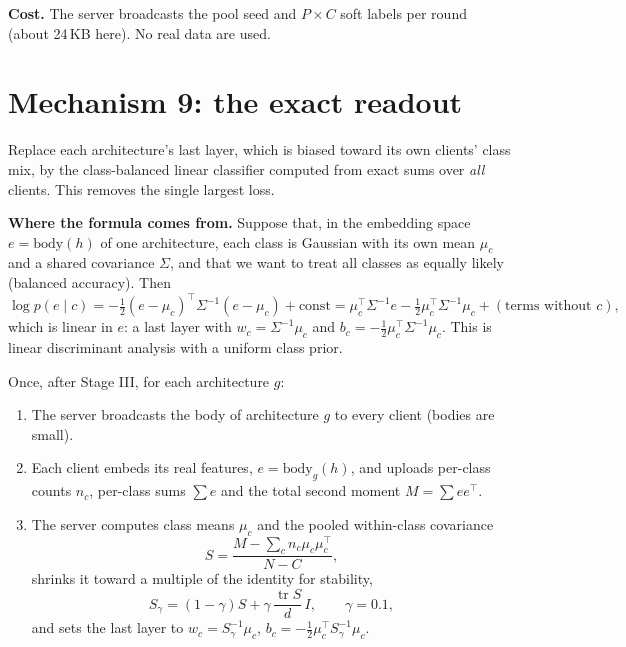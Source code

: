 \documentclass[11pt]{article}
\theoremstyle{plain}
\theoremstyle{definition}
\begin{document}
\textbf{Cost.} The server broadcasts the pool seed and $P\times C$ soft labels per round (about 24\,KB here). No real
data are used.

\section{Mechanism 9: the exact readout}\label{sec:er}

\begin{purpose}
Replace each architecture's last layer, which is biased toward its own clients' class mix, by the class-balanced linear
classifier computed from exact sums over \emph{all} clients. This removes the single largest loss.
\end{purpose}

\textbf{Where the formula comes from.} Suppose that, in the embedding space $e=\mathrm{body}(h)$ of one architecture,
each class is Gaussian with its own mean $\mu_c$ and a shared covariance $\Sigma$, and that we want to treat all classes
as equally likely (balanced accuracy). Then
\[
\log p(e\mid c)=-\tfrac12(e-\mu_c)^\top\Sigma^{-1}(e-\mu_c)+\text{const}
=\mu_c^\top\Sigma^{-1}e-\tfrac12\mu_c^\top\Sigma^{-1}\mu_c+(\text{terms without }c),
\]
which is linear in $e$: a last layer with $w_c=\Sigma^{-1}\mu_c$ and $b_c=-\frac12\mu_c^\top\Sigma^{-1}\mu_c$. This is
linear discriminant analysis with a uniform class prior.

\begin{steps}
Once, after Stage III, for each architecture $g$:
\begin{enumerate}
\item The server broadcasts the body of architecture $g$ to every client (bodies are small).
\item Each client embeds its real features, $e=\mathrm{body}_g(h)$, and uploads per-class counts $n_c$, per-class sums
$\sum e$ and the total second moment $M=\sum ee^\top$.
\item The server computes class means $\mu_c$ and the pooled within-class covariance
\[
S=\frac{M-\sum_cn_c\mu_c\mu_c^\top}{N-C},
\]
shrinks it toward a multiple of the identity for stability,
\[
S_\gamma=(1-\gamma)S+\gamma\,\frac{\operatorname{tr}S}{d}\,I,\qquad\gamma=0.1,
\]
and sets the last layer to $w_c=S_\gamma^{-1}\mu_c$, $b_c=-\frac12\mu_c^\top S_\gamma^{-1}\mu_c$.
\end{enumerate}
\end{steps}
\end{document}
